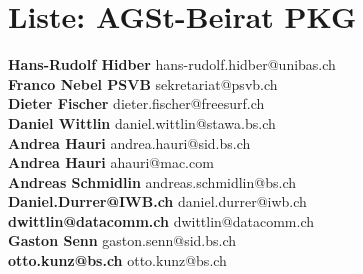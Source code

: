 \documentclass{scrartcl}
\begin{document}
\section*{Liste: AGSt-Beirat PKG}
\textbf{Hans-Rudolf Hidber } hans-rudolf.hidber@unibas.ch\\
\textbf{Franco Nebel PSVB } sekretariat@psvb.ch\\
\textbf{Dieter Fischer } dieter.fischer@freesurf.ch\\
\textbf{Daniel Wittlin } daniel.wittlin@stawa.bs.ch\\
\textbf{Andrea Hauri } andrea.hauri@sid.bs.ch\\
\textbf{Andrea Hauri } ahauri@mac.com\\
\textbf{Andreas Schmidlin } andreas.schmidlin@bs.ch\\
\textbf{Daniel.Durrer@IWB.ch } daniel.durrer@iwb.ch\\
\textbf{dwittlin@datacomm.ch } dwittlin@datacomm.ch\\
\textbf{Gaston Senn } gaston.senn@sid.bs.ch\\
\textbf{otto.kunz@bs.ch } otto.kunz@bs.ch\\
\end{document}
